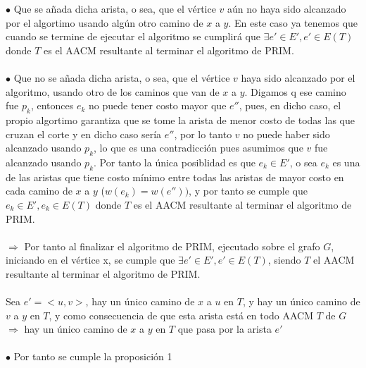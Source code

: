 \documentclass{article}
\begin{document}
    $\bullet$ Que se a\~nada dicha arista, o sea, que el v\'ertice $v$ a\'un no haya sido alcanzado por el algortimo usando alg\'un otro camino de $x$ a $y$. En este caso ya tenemos que cuando 
    se termine de ejecutar el algoritmo se cumplir\'a que $\exists e' \in E', e' \in E(T)$ donde $T$ es el AACM resultante al terminar el algoritmo de PRIM.\\\\

    $\bullet$ Que no se a\~nada dicha arista, o sea, que el v\'ertice $v$ haya sido alcanzado por el algoritmo, usando otro de los caminos que van de $x$ a $y$.
    Digamos q ese camino fue $p_k$, entonces $e_k$ no puede tener costo mayor que $e''$, pues, en dicho caso, el propio algortimo garantiza que se tome la arista de menor costo
    de todas las que cruzan el corte y en dicho caso ser\'ia $e''$, por lo tanto $v$ no puede haber sido alcanzado usando $p_k$, lo que es una contradicci\'on pues asumimos que $v$
    fue alcanzado usando $p_k$. Por tanto la \'unica posiblidad es que $e_k \in E'$, o sea $e_k$ es una de las aristas que tiene costo m\'inimo entre todas las aristas
    de mayor costo en cada camino de $x$ a $y$ ($w(e_k) = w(e''))$, y por tanto se cumple que $e_k \in E', e_k \in E(T)$ donde $T$ es el AACM resultante al terminar el algoritmo de PRIM.\\\\

    $\Rightarrow$ Por tanto al finalizar el algoritmo de PRIM, ejecutado sobre  el grafo $G$, iniciando en el v\'ertice x, se cumple que 
    $\exists e' \in E', e' \in E(T)$, siendo $T$ el AACM resultante al terminar el algoritmo de PRIM.\\\\

    Sea $e' = <u,v>$, hay un \'unico camino de $x$ a $u$ en $T$, y hay un \'unico camino de $v$ a $y$ en $T$, y como consecuencia de que esta arista est\'a en todo AACM $T$ de $G$
    $\Rightarrow$ hay un \'unico camino de $x$ a $y$ en $T$ que pasa por la arista $e'$\\\\

    $\bullet$ Por tanto se cumple la proposici\'on 1\\\\
\end{document}
